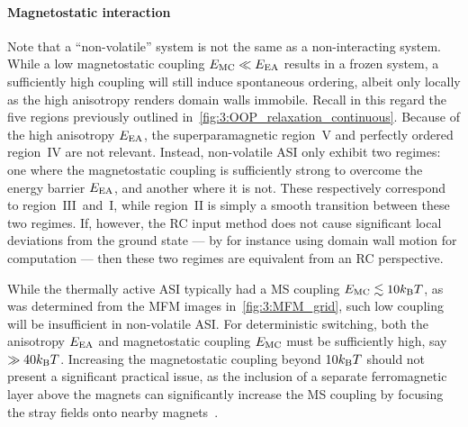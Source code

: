\paragraph{Magnetostatic interaction}
Note that a ``non-volatile'' system is not the same as a non-interacting system.
While a low magnetostatic coupling $E_\mathrm{MC} \ll E_\mathrm{EA}$ results in a frozen system, a sufficiently high coupling will still induce spontaneous ordering, albeit only locally as the high anisotropy renders domain walls immobile.
Recall in this regard the five regions previously outlined in~\cref{fig:3:OOP_relaxation_continuous}.
Because of the high anisotropy $E_\mathrm{EA}$, the superparamagnetic region~$\mathrm{V}$ and perfectly ordered region~$\mathrm{IV}$ are not relevant.
Instead, non-volatile ASI only exhibit two regimes: one where the magnetostatic coupling is sufficiently strong to overcome the energy barrier $E_\mathrm{EA}$, and another where it is not.
These respectively correspond to region~$\mathrm{III}$~and~$\mathrm{I}$, while region~$\mathrm{II}$ is simply a smooth transition between these two regimes.
If, however, the RC input method does not cause significant local deviations from the ground state --- by for instance using domain wall motion for computation --- then these two regimes are equivalent from an RC perspective. \par


While the thermally active ASI typically had a MS coupling $\EMC \lesssim 10\kBT$, as was determined from the MFM images in~\cref{fig:3:MFM_grid}, such low coupling will be insufficient in non-volatile ASI.
For deterministic switching, both the anisotropy $E_\mathrm{EA}$ and magnetostatic coupling $E_\mathrm{MC}$ must be sufficiently high, say $\gg 40 \kBT$.
Increasing the magnetostatic coupling beyond $10\kBT$ should not present a significant practical issue, as the inclusion of a separate ferromagnetic layer above the magnets can significantly increase the MS coupling by focusing the stray fields onto nearby magnets~\cite[Supp. 10]{KUR-24}.

